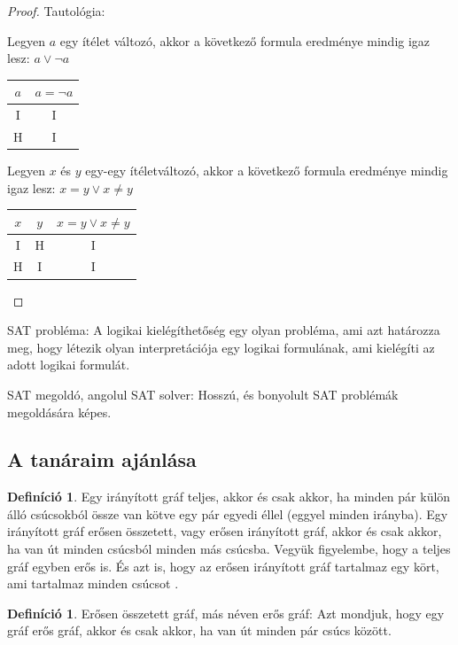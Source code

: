 \documentclass[
]{thesis-ekf}
\theoremstyle{definition}
\newtheorem{definicio}[tetel]{Definíció}
\theoremstyle{remark}
\begin{document}
	\begin{proof}\label{biz-tautologia}
		Tautológia: 
			
		Legyen $ a $ egy ítélet változó, akkor a következő formula eredménye mindig igaz lesz: $ a\vee\neg a $
		
		\begin{tabular}{|c|c|}
			\hline
			$ a $ & $ a=\neg a $ \\
			\hline
			I & I \\
			\hline
			H & I \\
			\hline
		\end{tabular}
	
		Legyen $ x $ és $ y $ egy-egy ítéletváltozó, akkor a következő formula eredménye mindig igaz lesz: $ x=y\vee x\ne y $
		
		\begin{tabular}{|c|c|c|}
			\hline
			$ x $ & $ y $ & $ x=y\vee x\ne y $ \\
			\hline
			I & H & I \\
			\hline
			H & I & I \\
			\hline
		\end{tabular}
	\end{proof}
	
	\textsc{SAT} probléma: A logikai kielégíthetőség egy olyan probléma, ami azt határozza meg, hogy létezik olyan interpretációja egy logikai formulának, ami kielégíti az adott logikai formulát.
	
	\textsc{SAT} megoldó, angolul \textsc{SAT} solver: Hosszú, és bonyolult \textsc{SAT} problémák megoldására képes.

	\subsection{A tanáraim ajánlása}\label{ssec-szakirodalom}
	\begin{definicio}
		Egy irányított gráf teljes, akkor és csak akkor, ha minden pár külön álló csúcsokból össze van kötve egy pár egyedi éllel (eggyel minden irányba). Egy irányított gráf erősen összetett, vagy erősen irányított gráf, akkor és csak akkor, ha van út minden csúcsból minden más csúcsba. Vegyük figyelembe, hogy a teljes gráf egyben erős is. És azt is, hogy az erősen irányított gráf tartalmaz egy kört, ami tartalmaz minden csúcsot \cite{am}.
	\end{definicio}

	\begin{definicio}
		Erősen összetett gráf, más néven erős gráf: Azt mondjuk, hogy egy gráf erős gráf, akkor és csak akkor, ha van út minden pár csúcs között.
	\end{definicio}
	
\end{document}
